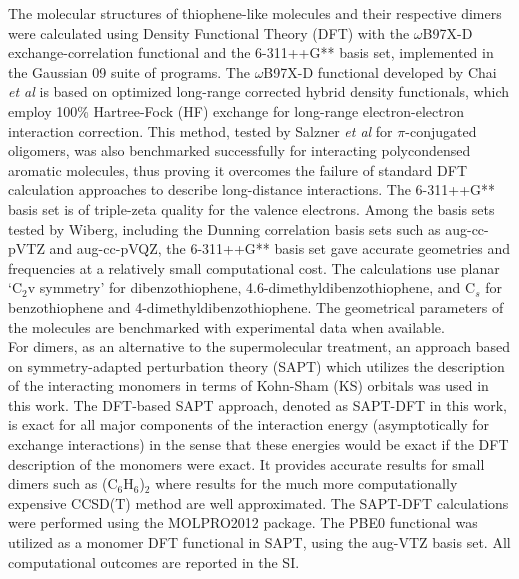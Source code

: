	The molecular structures of thiophene-like molecules and their respective dimers were calculated using Density Functional Theory (DFT) with the $\omega$B97X-D exchange-correlation functional and the   6-311++G** basis set, implemented in the Gaussian 09 suite of programs. The $\omega$B97X-D functional developed by Chai \textit{et al}\cite{chai2008systematic} is based on optimized long-range corrected hybrid density functionals, which employ 100\% Hartree-Fock (HF) exchange for long-range electron-electron interaction correction. This method, tested by Salzner \textit{et al}\cite{salzner2011improved} for $\pi$-conjugated oligomers, was also benchmarked successfully for interacting polycondensed aromatic molecules, \cite{spillebout2014discerning} thus proving it overcomes the failure of standard DFT calculation approaches to describe long-distance interactions. The 6-311++G** basis set is of triple-zeta quality for the valence electrons. Among the basis sets tested by Wiberg, \cite{wiberg2004basis} including the Dunning correlation basis sets such as aug-cc-pVTZ and aug-cc-pVQZ, the 6-311++G** basis set gave accurate geometries and frequencies at a relatively small computational cost. The calculations use planar ‘C$_{2}$v symmetry’ for dibenzothiophene, 4.6-dimethyldibenzothiophene, and C$_{s}$ for benzothiophene and 4-dimethyldibenzothiophene. The geometrical parameters of the molecules are benchmarked with experimental data when available.\\
	
	For dimers, as an alternative to the supermolecular treatment, an approach based on symmetry-adapted perturbation theory (SAPT)\cite{jeziorski1994perturbation} which utilizes the description of the interacting monomers in terms of Kohn-Sham (KS) orbitals was used in this work. The DFT-based SAPT approach,\cite{hesselmann2005density} denoted as SAPT-DFT in this work, is exact for all major components of the interaction energy (asymptotically for exchange interactions) in the sense that these energies would be exact if the DFT description of the monomers were exact. It provides accurate results for small dimers such as (C$_{6}$H$_{6}$)$_{2}$ where results for the much more computationally expensive CCSD(T) method are well approximated.\cite{podeszwa2006potential} The SAPT-DFT calculations were performed using the MOLPRO2012 package.\cite{MOLPRO_brief} The PBE0 functional\cite{adamo1999toward} was utilized as a monomer DFT functional in SAPT, using the aug-VTZ basis set. All computational outcomes are reported in the SI.
	
